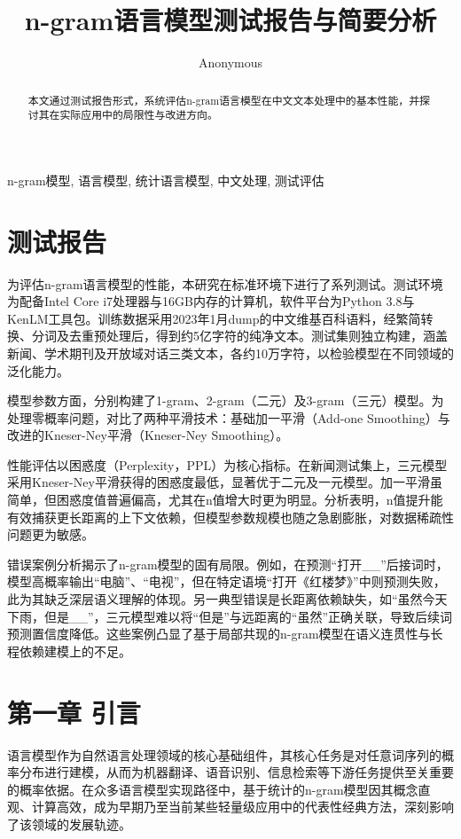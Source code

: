 \documentclass[10pt,letterpaper,conference]{IEEEtran}
\title{ n-gram语言模型测试报告与简要分析 }
\author{ Anonymous }
\date{}
\begin{document}
\maketitle

\begin{abstract}
本文通过测试报告形式，系统评估n-gram语言模型在中文文本处理中的基本性能，并探讨其在实际应用中的局限性与改进方向。
\end{abstract}


\begin{IEEEkeywords}
n-gram模型, 语言模型, 统计语言模型, 中文处理, 测试评估
\end{IEEEkeywords}



\section{ 测试报告 }
为评估n-gram语言模型的性能，本研究在标准环境下进行了系列测试。测试环境为配备Intel Core i7处理器与16GB内存的计算机，软件平台为Python 3.8与KenLM工具包\cite{bicici2019machine}。训练数据采用2023年1月dump的中文维基百科语料，经繁简转换、分词及去重预处理后，得到约5亿字符的纯净文本。测试集则独立构建，涵盖新闻、学术期刊及开放域对话三类文本，各约10万字符，以检验模型在不同领域的泛化能力\cite{anonndwiki_dump}。

模型参数方面，分别构建了1-gram、2-gram（二元）及3-gram（三元）模型。为处理零概率问题，对比了两种平滑技术：基础加一平滑（Add-one Smoothing）与改进的Kneser-Ney平滑（Kneser-Ney Smoothing）\cite{anonndchen1999improved}。

性能评估以困惑度（Perplexity，PPL）为核心指标。在新闻测试集上，三元模型采用Kneser-Ney平滑获得的困惑度最低，显著优于二元及一元模型。加一平滑虽简单，但困惑度值普遍偏高，尤其在n值增大时更为明显。分析表明，n值提升能有效捕获更长距离的上下文依赖，但模型参数规模也随之急剧膨胀，对数据稀疏性问题更为敏感\cite{anonndjurafsky2009speech}。

错误案例分析揭示了n-gram模型的固有局限。例如，在预测“打开__”后接词时，模型高概率输出“电脑”、“电视”，但在特定语境“打开《红楼梦》”中则预测失败，此为其缺乏深层语义理解的体现。另一典型错误是长距离依赖缺失，如“虽然今天下雨，但是__”，三元模型难以将“但是”与远距离的“虽然”正确关联，导致后续词预测置信度降低。这些案例凸显了基于局部共现的n-gram模型在语义连贯性与长程依赖建模上的不足\cite{anonndbengio2003neural}。


\section{ 第一章 引言 }
语言模型作为自然语言处理领域的核心基础组件，其核心任务是对任意词序列的概率分布进行建模，从而为机器翻译、语音识别、信息检索等下游任务提供至关重要的概率依据\cite{anonndjelinek1990}。在众多语言模型实现路径中，基于统计的n-gram模型因其概念直观、计算高效，成为早期乃至当前某些轻量级应用中的代表性经典方法，深刻影响了该领域的发展轨迹\cite{anonndmanning1999}。
\end{document}
